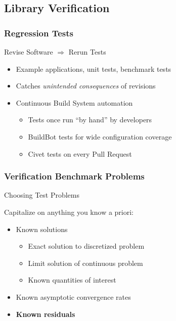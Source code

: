 \subsection{Library Verification}

\begin{frame}
\frametitle{Regression Tests}
\begin{block}{Revise Software $\Rightarrow$ Rerun Tests}
\begin{itemize}
\item Example applications, unit tests, benchmark tests
\item Catches {\textit{unintended consequences}} of revisions
\item Continuous Build System automation
\begin{itemize}
\item Tests once run ``by hand'' by \libMesh{} developers
\item BuildBot tests for wide configuration coverage
\item Civet tests on every Pull Request
\end{itemize}
\end{itemize}
\end{block}

\end{frame}


\begin{frame}
\frametitle{Verification Benchmark Problems}
\begin{block}{Choosing Test Problems}

Capitalize on anything you know a priori:

\begin{itemize}
\item Known solutions
\begin{itemize}
\item Exact solution to discretized problem
\item Limit solution of continuous problem
\item Known quantities of interest
\end{itemize}
\item Known asymptotic convergence rates
\item {\bf Known residuals}
\end{itemize}
\end{block}
\end{frame}

